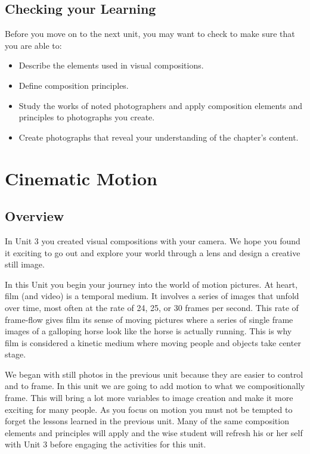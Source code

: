 \documentclass[
]{book}
\providecommand{\tightlist}{%
  \setlength{\itemsep}{0pt}\setlength{\parskip}{0pt}}
\begin{document}
\hypertarget{checking-your-learning-2}{%
\section*{Checking your Learning}\label{checking-your-learning-2}}

\begin{progress}
Before you move on to the next unit, you may want to check to make sure that you are able to:

\begin{itemize}
\tightlist
\item
  Describe the elements used in visual compositions.
\item
  Define composition principles.
\item
  Study the works of noted photographers and apply composition elements and principles to photographs you create.
\item
  Create photographs that reveal your understanding of the chapter's content.
\end{itemize}
\end{progress}

\hypertarget{cinematic-motion}{%
\chapter{Cinematic Motion}\label{cinematic-motion}}

\hypertarget{overview-3}{%
\section*{Overview}\label{overview-3}}

In Unit 3 you created visual compositions with your camera. We hope you found it exciting to go out and explore your world through a lens and design a creative still image.

In this Unit you begin your journey into the world of motion pictures. At heart, film (and video) is a temporal medium. It involves a series of images that unfold over time, most often at the rate of 24, 25, or 30 frames per second. This rate of frame-flow gives film its sense of moving pictures where a series of single frame images of a galloping horse look like the horse is actually running. This is why film is considered a kinetic medium where moving people and objects take center stage.

We began with still photos in the previous unit because they are easier to control and to frame. In this unit we are going to add motion to what we compositionally frame. This will bring a lot more variables to image creation and make it more exciting for many people. As you focus on motion you must not be tempted to forget the lessons learned in the previous unit. Many of the same composition elements and principles will apply and the wise student will refresh his or her self with Unit 3 before engaging the activities for this unit.
\end{document}
